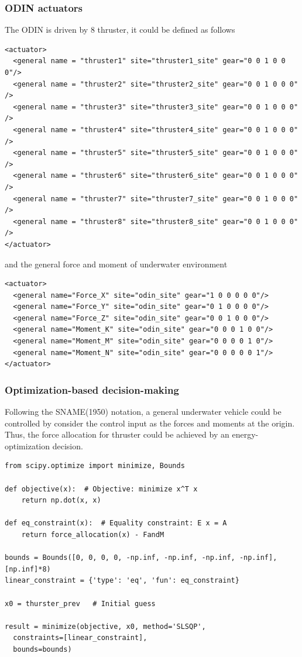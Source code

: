 \documentclass[9pt]{beamer}
\begin{document}
		
		\begin{frame}[fragile]
			\frametitle{ODIN actuators}
			The ODIN is driven by 8 thruster, it could be defined as follows
				\begin{verbatim}
<actuator>
  <general name = "thruster1" site="thruster1_site" gear="0 0 1 0 0 0"/>
  <general name = "thruster2" site="thruster2_site" gear="0 0 1 0 0 0" />
  <general name = "thruster3" site="thruster3_site" gear="0 0 1 0 0 0" />
  <general name = "thruster4" site="thruster4_site" gear="0 0 1 0 0 0" />
  <general name = "thruster5" site="thruster5_site" gear="0 0 1 0 0 0" />
  <general name = "thruster6" site="thruster6_site" gear="0 0 1 0 0 0" />
  <general name = "thruster7" site="thruster7_site" gear="0 0 1 0 0 0" />
  <general name = "thruster8" site="thruster8_site" gear="0 0 1 0 0 0" />
</actuator>	
			\end{verbatim}
		and the general force and moment of underwater environment
			\begin{verbatim}
<actuator>
  <general name="Force_X" site="odin_site" gear="1 0 0 0 0 0"/>
  <general name="Force_Y" site="odin_site" gear="0 1 0 0 0 0"/>
  <general name="Force_Z" site="odin_site" gear="0 0 1 0 0 0"/>
  <general name="Moment_K" site="odin_site" gear="0 0 0 1 0 0"/>
  <general name="Moment_M" site="odin_site" gear="0 0 0 0 1 0"/>
  <general name="Moment_N" site="odin_site" gear="0 0 0 0 0 1"/>
</actuator>
		\end{verbatim}

			
		\end{frame}
			
			
			
			    
			
			\begin{frame}[fragile]
				\frametitle{Optimization-based decision-making}
				Following the SNAME(1950) notation, a general underwater vehicle could be controlled by consider the control input as the forces and moments at the origin. Thus, the force allocation for thruster could be achieved by an energy-optimization decision.
				\begin{verbatim}
from scipy.optimize import minimize, Bounds
					
def objective(x):  # Objective: minimize x^T x
	return np.dot(x, x)		
	
def eq_constraint(x):  # Equality constraint: E x = A
	return force_allocation(x) - FandM 		

bounds = Bounds([0, 0, 0, 0, -np.inf, -np.inf, -np.inf, -np.inf], [np.inf]*8)
linear_constraint = {'type': 'eq', 'fun': eq_constraint}

x0 = thurster_prev   # Initial guess

result = minimize(objective, x0, method='SLSQP',
  constraints=[linear_constraint],
  bounds=bounds)
				\end{verbatim}
			\end{frame}
		
\end{document}
